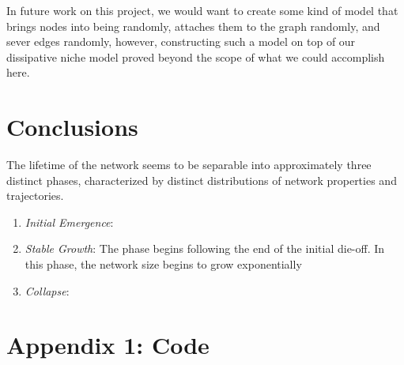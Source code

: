 \documentclass{paper}
\begin{document}
	In future work on this project, we would want to create some kind of model that brings nodes into being randomly, attaches them to the graph randomly, and sever edges randomly, however, constructing such a model on top of our dissipative niche model proved beyond the scope of what we could accomplish here. 
	
	
	\section{Conclusions}
	
	The lifetime of the network seems to be separable into approximately three distinct phases, characterized by distinct distributions of network properties and trajectories. 
	\begin{enumerate}
		\item \textit{Initial Emergence}:
		\item \textit{Stable Growth}: The phase begins following the end of the initial die-off. In this phase, the network size begins to grow exponentially
		\item \textit{Collapse}:
	\end{enumerate}
	
	
	
	
	\section{Appendix 1: Code}
\end{document}
